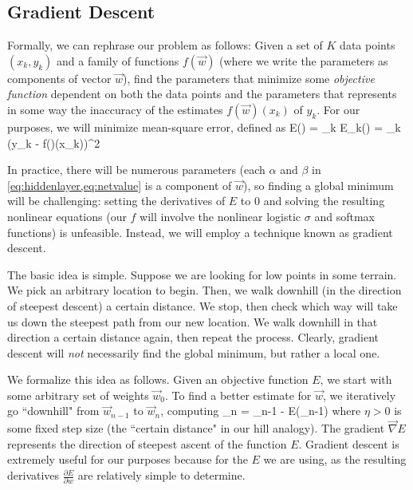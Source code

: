 \documentclass[10pt]{article}
\begin{document}
\subsection{Gradient Descent}

Formally, we can rephrase our problem as follows: Given a set of $K$ data points $(x_k, y_k)$ and a family of functions $f(\vec{w})$ (where we write the parameters as components of vector $\vec{w}$), find the parameters that minimize some \emph{objective function} dependent on both the data points and the parameters that represents in some way the inaccuracy of the estimates $f(\vec{w})(x_k)$ of $y_k$. For our purposes, we will minimize mean-square error, defined as
\beq
\label{eq:meansqerror}
E() = \sum_k E_k() = \sum_k (y_k - f()(x_k))^2
\eeq

In practice, there will be numerous parameters (each $\alpha$ and $\beta$ in \cref{eq:hiddenlayer,eq:netvalue} is a component of $\vec{w}$), so finding a global minimum will be challenging: setting the derivatives of $E$ to 0 and solving the resulting nonlinear equations (our $f$ will involve the nonlinear logistic $\sigma$ and softmax functions) is unfeasible. Instead, we will employ a technique known as gradient descent.

The basic idea is simple. Suppose we are looking for low points in some terrain. We pick an arbitrary location to begin. Then, we walk downhill (in the direction of steepest descent) a certain distance. We stop, then check which way will take us down the steepest path from our new location. We walk downhill in that direction a certain distance again, then repeat the process. Clearly, gradient descent will \emph{not} necessarily find the global minimum, but rather a local one.

We formalize this idea as follows. Given an objective function $E$, we start with some arbitrary set of weights $\vec{w}_0$. To find a better estimate for $\vec{w}$, we iteratively go ``downhill" from $\vec{w}_{n-1}$ to $\vec{w}_{n}$, computing
\beq
\label{eq:graddescent}
_n = _{n-1} - \eta\vec{\nabla} E(_{n-1})
\eeq
where $\eta > 0$ is some fixed step size (the ``certain distance" in our hill analogy). The gradient $\vec{\nabla} E$ represents the direction of steepest ascent of the function $E$. Gradient descent is extremely useful for our purposes because for the $E$ we are using, as the resulting derivatives $\frac{\partial E}{\partial w}$ are relatively simple to determine.
\end{document}
